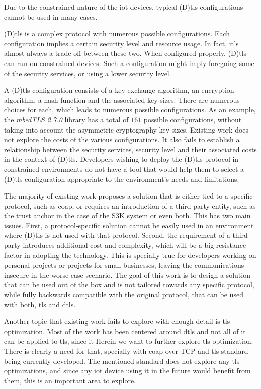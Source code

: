 \documentclass{llncs}
\begin{document}
Due to the constrained nature of the \gls{iot} devices, typical (D)\gls{tls} configurations cannot be
used in many cases.

(D)\gls{tls} is a complex protocol with numerous possible configurations. Each configuration
implies a certain security level and resource usage. In fact, it's almost always a trade-off
between these two. When configured properly, (D)\gls{tls} can run on constrained devices.
Such a configuration might imply foregoing some of the security services, or using a lower
security level.

A (D)\gls{tls} configuration consists of a key exchange algorithm, an encryption algorithm,
a hash function and the associated key sizes. There are numerous choices for each, which leads to
numerous possible configurations. As an example, the \textit{mbedTLS 2.7.0} library has a total
of $161$ possible configurations, without taking into account the asymmetric cryptography key sizes.
Existing work does not explore the costs of the various configurations. It also fails to
establish a relationship between the security services, security level and their associated
costs in the context of (D)\gls{tls}. Developers wishing to deploy the (D)\gls{tls} protocol
in constrained environments do not have a tool that would help them to select a (D)\gls{tls}
configuration appropriate to the environment's needs and limitations.

The majority of existing work proposes a solution that is either tied to a
specific protocol, such as \gls{coap}, or requires an introduction of a third-party
entity, such as the trust anchor in the case of the S3K system\cite{S3KScala62:online} or
even both. This has two main issues. First, a protocol-specific solution cannot
be easily used in an environment where (D)\gls{tls} is not used with that protocol.
Second, the requirement of a third-party
introduces additional cost and complexity, which will be a big resistance factor
in adopting the technology. This is specially true for developers working on
personal projects or projects for small businesses, leaving the communications insecure
in the worse case scenario. The goal of this work is to design a solution that can be used out
of the box and is not tailored towards any specific protocol, while fully backwards
compatible with the original protocol, that can be used with both, \gls{tls}
and \gls{dtls}.

Another topic that existing work fails to explore with enough detail is \gls{tls} optimization.
Most of the work has been centered around \gls{dtls} and not all of it can be applied to \gls{tls},
since it
Herein we want to further explore \gls{tls} optimization. There is clearly a need for that,
specially with \gls{coap} over TCP and \gls{tls} standard being currently developed. The
mentioned standard does not explore any \gls{tls} optimizations, and since any
\gls{iot} device using it in the future would benefit from them, this is an important
area to explore.
\end{document}
